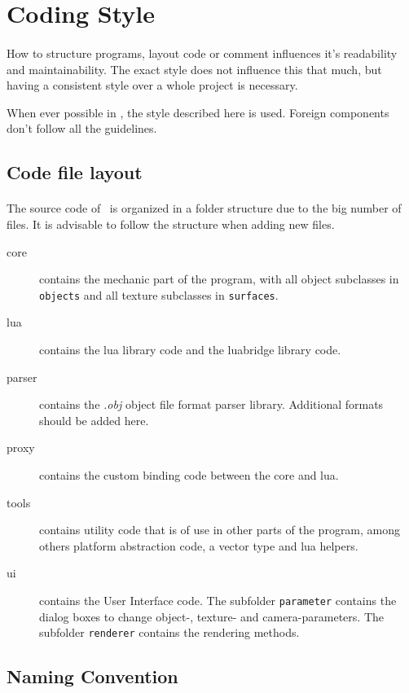 \section{Coding Style}
\paragraph{}
How to structure programs, layout code or comment influences it's readability and maintainability.
The exact style does not influence this that much, but having a consistent style over a whole project is necessary.

When ever possible in \ER, the style described here is used.
Foreign components don't follow all the guidelines.

\subsection{Code file layout}
\paragraph{}
The source code of \ER\ is organized in a folder structure due to the big number of files.
It is advisable to follow the structure when adding new files.

\begin{description}
\item[{core}] contains the mechanic part of the program, with all object subclasses in \texttt{objects} and all texture subclasses in \texttt{surfaces}.
\item[{lua}] contains the lua library code and the luabridge library code.
\item[{parser}] contains the \textit{.obj} object file format parser library.
Additional formats should be added here.
\item[{proxy}] contains the custom binding code between the core and lua.
\item[{tools}] contains utility code that is of use in other parts of the program, among others platform abstraction code, a vector type and lua helpers.
\item[{ui}] contains the User Interface code.
The subfolder \texttt{parameter} contains the dialog boxes to change object-, texture- and camera-parameters.
The subfolder \texttt{renderer} contains the rendering methods.
\end{description}

\subsection{Naming Convention}
